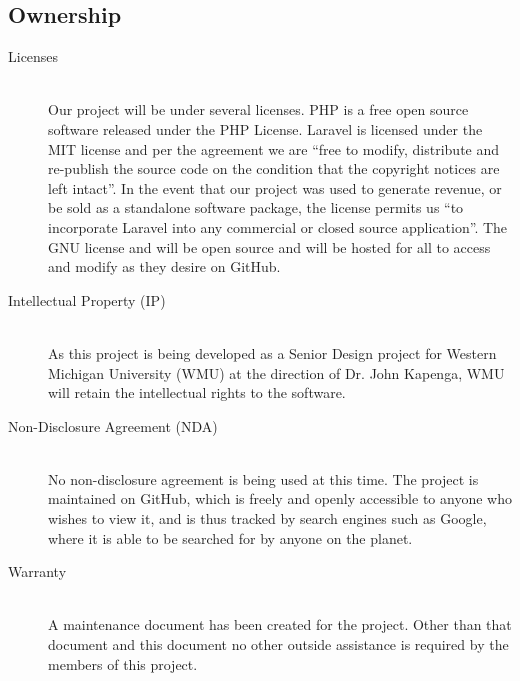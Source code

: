 \documentclass{report}
\begin{document}
\subsection*{Ownership}
\begin{description}
\item [Licenses] \hfill \\
Our project will be under several licenses. PHP is a free open source software released under the PHP License.
Laravel is licensed under the MIT license and per the agreement we are “free to modify, distribute and re-publish the source code on the condition that the copyright notices are left intact”.
In the event that our project was used to generate revenue, or be sold as a standalone software package, the license permits us “to incorporate Laravel into any commercial or closed source application”.  
The GNU license and will be open source and will be hosted for all to access and modify as they desire on GitHub.
\item [Intellectual Property (IP)] \hfill \\
As this project is being developed as a Senior Design project for Western Michigan University (WMU) at the direction of Dr. John Kapenga, WMU will retain the intellectual rights to the software.
\item [Non-Disclosure Agreement (NDA)] \hfill \\
No non-disclosure agreement is being used at this time.  The project is maintained on GitHub, which is freely and openly accessible to anyone who wishes to view it, and is thus tracked by search engines such as Google, where it is able to be searched for by anyone on the planet.
\item [Warranty] \hfill \\
A maintenance document has been created for the project. Other than that document and this document no other outside assistance is required by the members of this project.
\end{description}
\end{document}
